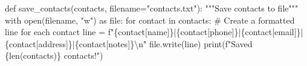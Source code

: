 \documentclass[
  letterpaper,
  DIV=11,
  numbers=noendperiod,
  oneside]{scrreprt}
\newenvironment{Shaded}{}{}
\newcommand{\BuiltInTok}[1]{\textcolor[rgb]{0.84,0.23,0.29}{#1}}
\newcommand{\CharTok}[1]{\textcolor[rgb]{0.01,0.18,0.38}{#1}}
\newcommand{\CommentTok}[1]{\textcolor[rgb]{0.42,0.45,0.49}{#1}}
\newcommand{\ControlFlowTok}[1]{\textcolor[rgb]{0.84,0.23,0.29}{#1}}
\newcommand{\ImportTok}[1]{\textcolor[rgb]{0.01,0.18,0.38}{#1}}
\newcommand{\KeywordTok}[1]{\textcolor[rgb]{0.84,0.23,0.29}{#1}}
\newcommand{\NormalTok}[1]{\textcolor[rgb]{0.14,0.16,0.18}{#1}}
\newcommand{\OperatorTok}[1]{\textcolor[rgb]{0.14,0.16,0.18}{#1}}
\newcommand{\SpecialCharTok}[1]{\textcolor[rgb]{0.00,0.36,0.77}{#1}}
\newcommand{\SpecialStringTok}[1]{\textcolor[rgb]{0.01,0.18,0.38}{#1}}
\newcommand{\StringTok}[1]{\textcolor[rgb]{0.01,0.18,0.38}{#1}}
\begin{document}
\begin{Shaded}
\begin{Highlighting}[]
\KeywordTok{def}\NormalTok{ save\_contacts(contacts, filename}\OperatorTok{=}\StringTok{"contacts.txt"}\NormalTok{):}
    \CommentTok{"""Save contacts to file"""}
    \ControlFlowTok{with} \BuiltInTok{open}\NormalTok{(filename, }\StringTok{"w"}\NormalTok{) }\ImportTok{as} \BuiltInTok{file}\NormalTok{:}
        \ControlFlowTok{for}\NormalTok{ contact }\KeywordTok{in}\NormalTok{ contacts:}
            \CommentTok{\# Create a formatted line for each contact}
\NormalTok{            line }\OperatorTok{=} \SpecialStringTok{f"}\SpecialCharTok{\{}\NormalTok{contact[}\StringTok{\textquotesingle{}name\textquotesingle{}}\NormalTok{]}\SpecialCharTok{\}}\SpecialStringTok{|}\SpecialCharTok{\{}\NormalTok{contact[}\StringTok{\textquotesingle{}phone\textquotesingle{}}\NormalTok{]}\SpecialCharTok{\}}\SpecialStringTok{|}\SpecialCharTok{\{}\NormalTok{contact[}\StringTok{\textquotesingle{}email\textquotesingle{}}\NormalTok{]}\SpecialCharTok{\}}\SpecialStringTok{|}\SpecialCharTok{\{}\NormalTok{contact[}\StringTok{\textquotesingle{}address\textquotesingle{}}\NormalTok{]}\SpecialCharTok{\}}\SpecialStringTok{|}\SpecialCharTok{\{}\NormalTok{contact[}\StringTok{\textquotesingle{}notes\textquotesingle{}}\NormalTok{]}\SpecialCharTok{\}}\CharTok{\textbackslash{}n}\SpecialStringTok{"}
            \BuiltInTok{file}\NormalTok{.write(line)}
    \BuiltInTok{print}\NormalTok{(}\SpecialStringTok{f"Saved }\SpecialCharTok{\{}\BuiltInTok{len}\NormalTok{(contacts)}\SpecialCharTok{\}}\SpecialStringTok{ contacts!"}\NormalTok{)}


\end{Highlighting}
\end{Shaded}
\end{document}
